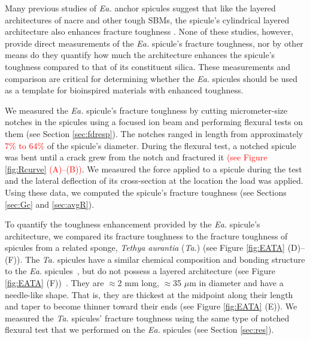 \documentclass[12pt,onecolumn]{article}
\makeatletter
\newcommand{\TA}{\textit{Ta.\@}\xspace}
\newcommand{\EA}{\textit{Ea.\@}\xspace}
\makeatother
\begin{document}
\begin{bibunit}
Many previous studies of \EA anchor spicules suggest that like the layered architectures of nacre and other tough SBMs, the spicule's cylindrical layered architecture also enhances fracture toughness \cite{mayer2005rigid,mayer2011new,walter2007mechanisms,kolednik2011bioinspired}. None of these studies, however, provide direct measurements of the \EA spicule's fracture toughness, nor by other means do they quantify how much the architecture enhances the spicule's toughness compared to that of its constituent silica. These measurements and comparison are critical for determining whether the \EA spicules should be used as a template for bioinspired materials with enhanced toughness. 

We measured the \EA spicule's fracture toughness by cutting micrometer-size notches in the spicules using a focused ion beam and performing flexural tests on them (see Section \ref{sec:fdresp}). The notches ranged in length from approximately \textcolor{red}{7\% to 64\%} of the spicule's diameter. During the flexural test, a notched spicule was bent until a crack grew from the notch and fractured it \textcolor{red}{(see Figure \ref{fig:Rcurve} (A)--(B))}. We measured the force applied to a spicule during the test and the lateral deflection of its cross-section at the location the load was applied. Using these data, we computed the spicule's fracture toughness (see Sections \ref{sec:Gc} and \ref{sec:avgR}).

To quantify the toughness enhancement provided by the \EA spicule's architecture, we compared its fracture toughness to the fracture toughness of spicules from a related sponge, \textit{Tethya aurantia} (\TA) (see Figure \ref{fig:EATA} (D)--(F)). The \TA spicules have a similar chemical composition and bonding structure to the \EA spicules~\cite{weaver2010unifying}, but do not possess a layered architecture (see Figure \ref{fig:EATA} (F))~\cite{monn2017new}. They are $\approx$2 mm long, $\approx$35 $\mu$m in diameter and have a needle-like shape. That is, they are thickest at the midpoint along their length and taper to become thinner toward their ends (see Figure \ref{fig:EATA} (E)). We measured the \TA spicules' fracture toughness using the same type of notched flexural test that we performed on the \EA spicules (see Section \ref{sec:res}). 


\end{bibunit}
\end{document}
